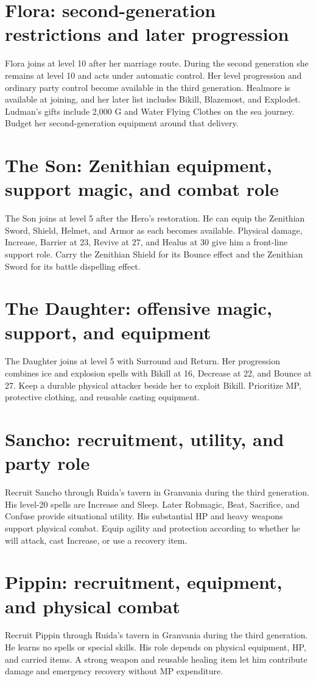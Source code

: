 \section{Flora: second-generation restrictions and later progression}
Flora joins at level 10 after her marriage route. During the second generation
she remains at level 10 and acts under automatic control. Her level progression
and ordinary party control become available in the third generation. Healmore
is available at joining, and her later list includes Bikill, Blazemost, and
Explodet. Ludman's gifts include 2,000 G and Water Flying Clothes on the sea
journey. Budget her second-generation equipment around that delivery.

\section{The Son: Zenithian equipment, support magic, and combat role}
The Son joins at level 5 after the Hero's restoration. He can equip the
Zenithian Sword, Shield, Helmet, and Armor as each becomes available. Physical
damage, Increase, Barrier at 23, Revive at 27, and Healus at 30 give him a
front-line support role. Carry the Zenithian Shield for its Bounce effect and
the Zenithian Sword for its battle dispelling effect.

\section{The Daughter: offensive magic, support, and equipment}
The Daughter joins at level 5 with Surround and Return. Her progression
combines ice and explosion spells with Bikill at 16, Decrease at 22, and
Bounce at 27. Keep a durable physical attacker beside her to exploit Bikill.
Prioritize MP, protective clothing, and reusable casting equipment.

\section{Sancho: recruitment, utility, and party role}
Recruit Sancho through Ruida's tavern in Granvania during the third generation.
His level-20 spells are Increase and Sleep. Later Robmagic, Beat, Sacrifice,
and Confuse provide situational utility. His substantial HP and heavy weapons
support physical combat. Equip agility and protection according to whether he
will attack, cast Increase, or use a recovery item.

\section{Pippin: recruitment, equipment, and physical combat}
Recruit Pippin through Ruida's tavern in Granvania during the third generation.
He learns no spells or special skills. His role depends on physical equipment,
HP, and carried items. A strong weapon and reusable healing item let him
contribute damage and emergency recovery without MP expenditure.

